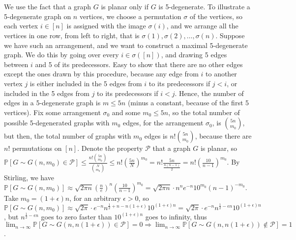 \documentclass{article}
\begin{document}
\section{}
We use the fact that a graph $G$ is planar only if $G$ is 5-degenerate. To illustrate a 5-degenerate graph on $n$ vertices, we choose a permutation $\sigma$ of the vertices, so each vertex $i\in[n]$ is assigned with the image $\sigma(i)$, and we arrange all the vertices in one row, from left to right, that is $\sigma(1),\sigma(2),\dots,\sigma(n)$. Suppose we have such an arrangement, and we want to construct a maximal 5-degenerate graph. We do this by going over every $i\in\sigma([n])$, and drawing 5 edges between $i$ and 5 of its predecessors. Easy to show that there are no other edges except the ones drawn by this procedure, because any edge from $i$ to another vertex $j$ is either included in the 5 edges from $i$ to its predecessors if $j<i$, or included in the 5 edges from $j$ to its predecessors if $i<j$. Hence, the number of edges in a 5-degenerate graph is $m\leq{5n}$ (minus a constant, because of the first 5 vertices). Fix some arrangement $\sigma_0$ and some $m_0\leq{5n}$, so the total number of possible 5-degenerated graphs with $m_0$ edges, for the arrangement $\sigma_0$, is $\binom{5n}{m_0}$, but then, the total number of graphs with $m_0$ edges is $n!\binom{5n}{m_0}$, because there are $n!$ permutations on $[n]$. Denote the property $\mathcal{P}$ that a graph $G$ is planar, so $\mathbb{P}[G\sim{G(n,m_0)}\in\mathcal{P}]\leq{\frac{n!\binom{5n}{m_0}}{\binom{N}{m_0}}}\leq{n!(\frac{5n}{N})^{m_0}}=n!\frac{5n}{\frac{n(n-1)}{2}}=n!(\frac{10}{n-1})^{m_0}$. By Stirling, we have $\mathbb{P}[G\sim{G(n,m_0)}]\approx{\sqrt{2\pi{n}}(\frac{n}{e})^n(\frac{10}{n-1})^{m_0}}=\sqrt{2\pi{n}}\cdot{n^n}{e^{-n}}{10^{m_0}}{(n-1)^{-m_0}}$. Take $m_0=(1+\epsilon)n$, for an arbitrary $\epsilon>0$, so $\mathbb{P}[G\sim{G(n,m_0)}]\approx{\sqrt{2\pi}\cdot{e^{-n}n^{\frac{1}{2}+n-n(1+\epsilon)}10^{(1+\epsilon)n}}}=\sqrt{2\pi}\cdot{e^{-n}n^{\frac{1}{2}-\epsilon{n}}10^{(1+\epsilon)n}}$, but $n^{\frac{1}{2}-\epsilon{n}}$ goes to zero faster than $10^{(1+\epsilon)n}$ goes to infinity, thus $\lim_{n\rightarrow\infty}\mathbb{P}[G\sim{G(n,n(1+\epsilon))}\in\mathcal{P}]=0\Rightarrow\lim_{n\rightarrow\infty}\mathbb{P}[G\sim{G(n,n(1+\epsilon))}\notin\mathcal{P}]=1$.
\end{document}
